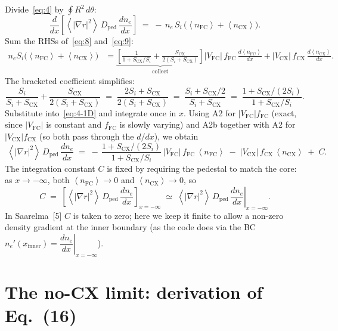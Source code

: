 \documentclass[11pt]{article}
\renewcommand{\ne}{n_{e}}  %
\newcommand{\nfc}{n_{\mathrm{FC}}}
\newcommand{\ncx}{n_{\mathrm{CX}}}
\newcommand{\Vfc}{\lvert V_{\mathrm{FC}}\rvert}
\newcommand{\Vcx}{\lvert V_{\mathrm{CX}}\rvert}
\newcommand{\Si}{S_{i}}
\newcommand{\Scx}{S_{\mathrm{CX}}}
\newcommand{\Dped}{D_{\mathrm{ped}}}
\newcommand{\fFC}{f_{\mathrm{FC}}}
\newcommand{\fCX}{f_{\mathrm{CX}}}
\newcommand{\fsa}[1]{\left\langle #1 \right\rangle}
\newcommand{\gradrsq}{\fsa{|\nabla r|^{2}}}
\newcommand{\neginf}{x=-\infty}
\newcommand{\dneneg}{\left.\dfrac{d\ne}{dx}\right|_{\neginf}}
\newcommand{\xin}{x_{\mathrm{inner}}}
\begin{document}
Divide~\eqref{eq:4} by $\oint R^{2}\,d\theta$:
\begin{equation}
  \frac{d}{dx}\!\left[\gradrsq\,\Dped\,\frac{d\ne}{dx}\right]
    \;=\; -\,\ne\,\Si\,\bigl(\fsa{\nfc}+\fsa{\ncx}\bigr).
  \label{eq:4-1D}
\end{equation}
Sum the RHSs of~\eqref{eq:8} and~\eqref{eq:9}:
\begin{align}
  \ne\Si\bigl(\fsa{\nfc}+\fsa{\ncx}\bigr)
    &= \underbrace{\left[\frac{1}{1+\Scx/\Si} + \frac{\Scx}{2(\Si+\Scx)}\right]}_{\displaystyle\text{collect}}\Vfc\,\fFC\,\frac{d\fsa{\nfc}}{dx}
      + \Vcx\,\fCX\,\frac{d\fsa{\ncx}}{dx}.
\end{align}
The bracketed coefficient simplifies:
\begin{equation}
  \frac{\Si}{\Si+\Scx} + \frac{\Scx}{2(\Si+\Scx)}
  \;=\; \frac{2\Si+\Scx}{2(\Si+\Scx)}
  \;=\; \frac{\Si+\Scx/2}{\Si+\Scx}
  \;=\; \frac{1+\Scx/(2\Si)}{1+\Scx/\Si}.
\end{equation}
Substitute into~\eqref{eq:4-1D} and integrate once in $x$.  Using A2 for
$\Vfc\fFC$ (exact, since $\Vfc$ is constant and $\fFC$ is slowly
varying) and A2b together with A2 for $\Vcx\fCX$ (so both pass through
the $d/dx$), we obtain
\begin{equation}
  \boxed{\;
    \gradrsq\,\Dped\,\frac{d\ne}{dx}
    \;=\;
    -\,\frac{1+\Scx/(2\Si)}{1+\Scx/\Si}\,\Vfc\,\fFC\,\fsa{\nfc}
    \;-\; \Vcx\,\fCX\,\fsa{\ncx}
    \;+\; C.
  \;}
  \label{eq:10}
\end{equation}
The integration constant $C$ is fixed by requiring the pedestal to match
the core: as $x\to-\infty$, both $\fsa{\nfc}\to 0$ and $\fsa{\ncx}\to 0$,
so
\begin{equation}
  C \;=\; \left[\gradrsq\,\Dped\,\frac{d\ne}{dx}\right]_{\neginf}
  \;\simeq\; \gradrsq\,\Dped\,\dneneg.
  \label{eq:Cvalue}
\end{equation}
In Saarelma~[5] $C$ is taken to zero; here we keep it finite to allow a
non-zero density gradient at the inner boundary (as the code does via the
BC $n_{e}'(\xin)=\dneneg$).

\section{The no-CX limit: derivation of Eq.~(16)}
\label{sec:eq-16}
\end{document}
